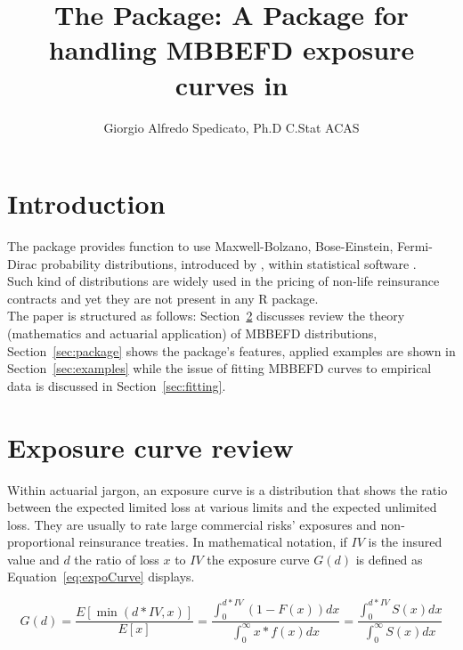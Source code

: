 \documentclass[nojss]{jss}
\author{Giorgio Alfredo Spedicato, Ph.D C.Stat ACAS}
\title{The \pkg{mbbefd} Package: A Package for handling MBBEFD exposure curves in \proglang{R}}
\begin{document}
\maketitle


\section{Introduction}

The  package provides function to use Maxwell-Bolzano, Bose-Einstein, Fermi-Dirac probability distributions, introduced by \citep{bernegger1997tile}, within  statistical software \citep{rSoftware}.\\ Such kind of distributions are widely used in the pricing of non-life reinsurance contracts and yet they are not present in any R package.\\

The paper is structured as follows: Section~\ref{sec:review} discusses review the theory (mathematics and actuarial application) of MBBEFD distributions, Section~\ref{sec:package} shows the package's features, applied examples are shown in Section~\ref{sec:examples} while the issue of fitting MBBEFD curves to empirical data is discussed in Section~\ref{sec:fitting}.\\



\section{Exposure curve review}\label{sec:review}

Within actuarial jargon, an exposure curve is a distribution that shows the ratio between the expected limited loss at various limits and the expected unlimited loss. They are usually to rate large commercial risks' exposures and non-proportional reinsurance treaties. In mathematical notation, if $IV$ is the insured value and $d$ the ratio of loss $x$ to $IV$ the exposure curve $G\left( d \right)$ is defined as Equation~\ref{eq:expoCurve} displays.

\begin{equation}
G\left( d \right) = \frac{{E\left[ {\min \left( {d*IV,x} \right)} \right]}}{{E\left[ x \right]}} = \frac{{\int_0^{d*IV} {\left( {1 - F\left( x \right)} \right)dx} }}{{\int_0^\infty  {x*f\left( x \right)dx} }} = \frac{{\int_0^{d*IV} {S\left( x \right)dx} }}{{\int_0^\infty  {S\left( x \right)dx} }}
\label{eq:expoCurve}
\end{equation}
\end{document}
